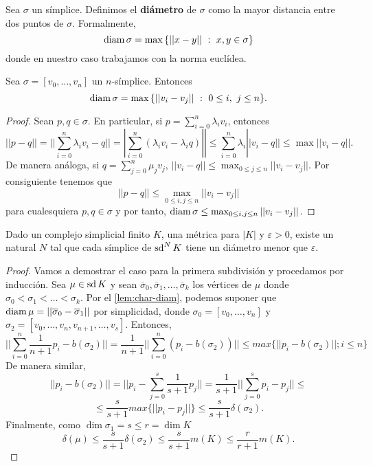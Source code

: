 \begin{definicion}
	Sea $\sigma$ un símplice. Definimos el \textbf{diámetro} de $\sigma$ como la mayor distancia entre dos puntos de $\sigma$. Formalmente,
	\[
		\diam \sigma = \max{\{||x-y||\ :\ x,y \in \sigma\}}
	\]
	donde en nuestro caso trabajamos con la norma euclídea.
\end{definicion}
\begin{lema}
	\label{lem:char-diam}
	Sea $\sigma = [v_0, \dots, v_n]$ un $n$-símplice. Entonces
	\[
		\diam \sigma = \max{\{||v_i-v_j||\ :\ 0 \leq i,\ j \leq n\}}.
	\]
\end{lema}
\begin{proof}
	Sean $p,q \in \sigma$. En particular, si $p = \sum_{i=0}^{n} \lambda_i v_i$, entonces
	\[
		||p-q||=||\sum_{i=0}^{n} \lambda _ {i} v_{i} - q||=| \sum _{i=0}^{n}(\lambda _{i} v_{i} - \lambda_{i} q)|| \leqslant \sum_{i=0}^{n} \lambda_{i} ||v_{i}-q|| \leqslant\max ||v_{i} -q||.
	\]
	De manera análoga, si $q = \sum_{j=0}^{n} \mu_j v_j$, $||v_i - q|| \leq \max_{0 \leq j \leq n} ||v_i -v_j||$. Por consiguiente tenemos que \[||p-q|| \leq \max_{0\leq i, j\leq n}||v_i-v_j||\] para cualesquiera $p,q \in \sigma$ y por tanto, $\operatorname{diam} \sigma \leq \max_{0\leq i, j\leq n}||v_i-v_j||$.
\end{proof}
\begin{teorema}
	Dado un complejo simplicial finito $K$, una métrica para $|K|$ y $\varepsilon > 0$, existe un natural $N$ tal que cada símplice de $\operatorname{sd}^N K$ tiene un diámetro menor que $\varepsilon$.
\end{teorema}
\begin{proof}
	Vamos a demostrar el caso para la primera subdivisión y procedamos por inducción. Sea $\mu \in \operatorname{sd} K$ y sean $\overline{\sigma}_0, \overline{\sigma}_1, \dots, \overline{\sigma}_k$ los vértices de $\mu$ donde $\sigma_0 < \sigma_1 < \dots < \sigma_k$. Por el \autoref{lem:char-diam}, podemos suponer que $\operatorname{diam} \mu = ||\overline{\sigma}_0 - \overline{\sigma}_1||$ por simplicidad, donde $\sigma_0 = [v_0, \dots, v_n]$ y $\sigma_2 = [v_0, \dots, v_n, v_{n+1}, \dots, v_s]$. Entonces,
	\[||\sum_{i=0}^{n}\frac{1}{n+1}p_{i}-b(\sigma_{2})||=\frac{1}{n+1}||\sum_{i=0}^{n}(p_{i}-b(\sigma_{2}))||\le max\{||p_{i}-b(\sigma_{2})||;i\le n\}\]
	De manera similar,
	\[||p_{i}-b(\sigma_{2})||=||p_{i}-\sum_{j=0}^{s}\frac{1}{s+1}p_{j}||=\frac{1}{s+1}||\sum_{j=0}^{s}p_{i}-p_{j}||\le\]
	\[\le\frac{s}{s+1}max\{||p_{i}-p_{j}||\}\le\frac{s}{s+1}\delta(\sigma_{2}).\]
	Finalmente, como $\dim \sigma_1 = s \leq r = \dim K$
	\[\delta(\mu)\le\frac{s}{s+1}\delta(\sigma_{2})\le\frac{s}{s+1}m(K)\le\frac{r}{r+1}m(K).\]
\end{proof}

